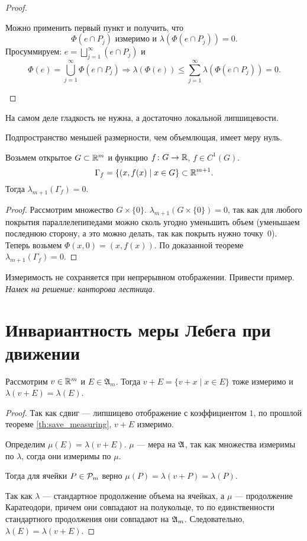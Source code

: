 \begin{proof}
\begin{description}
\begin{enumerate}
					Можно применить первый пункт и получить, что
					\[
						\Phi (e \cap P_j) \text{ измеримо и }  \lambda (\Phi (e \cap P_j)) = 0
					.\]
					Просуммируем:
					$
					e = \bigsqcup_{j=1}^{\infty} (e \cap P_j)
					$ и
					\[
						\Phi (e) = \bigcup_{j=1}^{\infty} \Phi (e \cap P_j) \Longrightarrow \lambda (\Phi (e)) \le  \sum_{j=1}^{\infty} \lambda (\Phi (e \cap P_j)) = 0
					.\]
			\end{enumerate}
	\end{description}
\end{proof}
\begin{rem}
	На самом деле гладкость не нужна, а достаточно локальной липшицевости.
\end{rem}
\begin{rem}
	Подпространство меньшей размерности, чем объемлющая, имеет меру нуль.
\end{rem}
\begin{cor}
	Возьмем открытое $ G \subset \R^{m} $ и функцию $ f\colon G \to \R$, $ f \in C^{1}(G)$. \[
		\Gamma _{f} = \{(x, f(x) \mid x \in G\} \subset \R^{m+1}
	.\]
	Тогда $ \lambda _{m+1}(\Gamma _f) = 0$.
\end{cor}
\begin{proof}
	Рассмотрим множество $ G\times \{0\} $. $ \lambda _{m+1}(G \times \{0\}) = 0$, так как для любого покрытия параллелепипедами можно сколь угодно уменьшить объем (уменьшаем последнюю сторону, а это можно делать, так как покрыть нужно точку~$ 0$). Теперь возьмем $ \Phi (x, 0) = (x, f(x))$.
	По доказанной теореме $ \lambda _{m+1}(\Gamma _{f}) = 0$.
\end{proof}
\begin{probl}
	Измеримость не сохраняется при непрерывном отображении. Привести пример. \textit{Намек на решение: канторова лестница.}
\end{probl}

\section{Инвариантность меры Лебега при движении}
\begin{thm}
	Рассмотрим $ v \in  \R^{m} $ и $ E \in \mathfrak{A}_{m}$. Тогда
	$ v + E = \{v + x \mid x \in E\}$ тоже измеримо и $ \lambda (v + E) = \lambda (E)$.
\end{thm}
\begin{proof}
	Так как сдвиг --- липшицево отображение с коэффициентом $ 1$, по прошлой теореме \ref{th:save_measuring},  $ v + E$ измеримо.

	Определим $ \mu(E) = \lambda (v + E)$. $ \mu$ --- мера на $ \A$, так как множества измеримы по $ \lambda $, согда они измеримы по $ \mu$.

	Тогда для ячейки $ P \in \P_m$ верно $ \mu(P) = \lambda (v + P) = \lambda (P)$.

	Так как $ \lambda $ --- стандартное продолжение объема на ячейках, а $ \mu$ --- продолжение Каратеодори, причем они совпадают на полукольце, то по единственности стандартного продолжения они совпадают на $ \A_{m}$. Следовательно, $ \lambda (E) = \lambda (v + E)$.
\end{proof}


